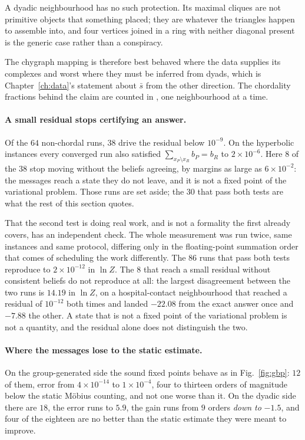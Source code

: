 A dyadic neighbourhood has no such protection. Its maximal cliques are not
primitive objects that something placed; they are whatever the triangles happen
to assemble into, and four vertices joined in a ring with neither diagonal
present is the generic case rather than a conspiracy.

The chygraph mapping is therefore best behaved where the data supplies its
complexes and worst where they must be inferred from dyads, which is
Chapter~\ref{ch:data}'s statement about $\bar s$ from the other direction. The chordality fractions behind the claim are counted in , one neighbourhood at a time.

\paragraph{A small residual stops certifying an answer.} Of the $64$ non-chordal runs, $38$ drive the residual below $10^{-9}$.
On the hyperbolic instances every converged run also satisfied
$\sum_{x_{P}\setminus x_{R}}b_{P}=b_{R}$ to $2\times10^{-6}$. Here $8$ of the
$38$ stop moving without the beliefs agreeing, by margins as large as
$6\times10^{-2}$: the messages reach a state they do not leave, and it is not a
fixed point of the variational problem. Those runs are set aside; the $30$ that
pass both tests are what the rest of this section quotes.

That the second test is doing real work, and is not a formality the first
already covers, has an independent check. The whole measurement was run twice,
same instances and same protocol, differing only in the floating-point summation
order that comes of scheduling the work differently. The $86$ runs that pass
both tests reproduce to $2\times10^{-12}$ in $\ln Z$. The $8$ that reach a small
residual without consistent beliefs do not reproduce at all: the largest
disagreement between the two runs is $14.19$ in $\ln Z$, on a hospital-contact
neighbourhood that reached a residual of $10^{-12}$ both times and landed
$-22.08$ from the exact answer once and $-7.88$ the other. A state that is not a
fixed point of the variational problem is not a quantity, and the residual alone
does not distinguish the two.

\paragraph{Where the messages lose to the static estimate.} On the
group-generated side the sound fixed points behave as in Fig.~\ref{fig:gbp}:
$12$ of them, error from $4\times10^{-14}$ to $1\times10^{-4}$, four
to thirteen orders of magnitude below the static M\"obius counting, and not one
worse than it. On the dyadic side there are $18$, the error runs to $5.9$, the
gain runs from $9$ orders \emph{down to} $-1.5$, and four of the eighteen are no
better than the static estimate they were meant to improve.

